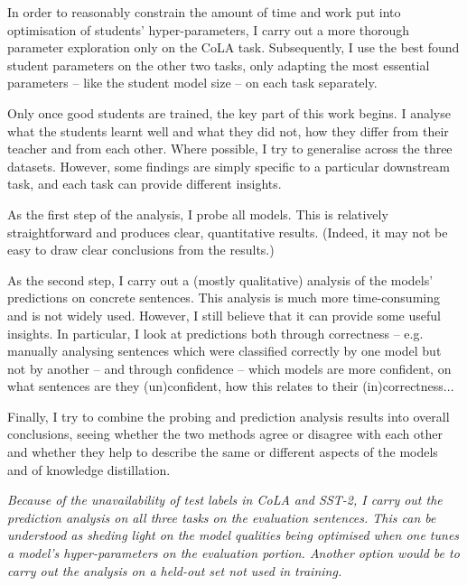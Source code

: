 \documentclass[bsc,frontabs,twoside,singlespacing,parskip,deptreport]{infthesis}
\begin{document}
{{    %
    In order to reasonably constrain the amount of time and work put into optimisation of students' hyper-parameters, I carry out a more thorough parameter exploration only on the CoLA task. Subsequently, I use the best found student parameters on the other two tasks, only adapting the most essential parameters -- like the student model size -- on each task separately.

    Only once good students are trained, the key part of this work begins. I analyse what the students learnt well and what they did not, how they differ from their teacher and from each other. Where possible, I try to generalise across the three datasets. However, some findings are simply specific to a particular downstream task, and each task can provide different insights.

    As the first step of the analysis, I probe all models. This is relatively straightforward and produces clear, quantitative results. (Indeed, it may not be easy to draw clear conclusions from the results.)

    As the second step, I carry out a (mostly qualitative) analysis of the models' predictions on concrete sentences. This analysis is much more time-consuming and is not widely used. However, I still believe that it can provide some useful insights. In particular, I look at predictions both through correctness -- e.g. manually analysing sentences which were classified correctly by one model but not by another -- and through confidence -- which models are more confident, on what sentences are they (un)confident, how this relates to their (in)correctness...

    Finally, I try to combine the probing and prediction analysis results into overall conclusions, seeing whether the two methods agree or disagree with each other and whether they help to describe the same or different aspects of the models and of knowledge distillation.

    \textit{Because of the unavailability of test labels in CoLA and SST-2, I carry out the prediction analysis on all three tasks on the evaluation sentences. This can be understood as sheding light on the model qualities being optimised when one tunes a model's hyper-parameters on the evaluation portion. Another option would be to carry out the analysis on a held-out set not used in training.}
  }

}
\end{document}
